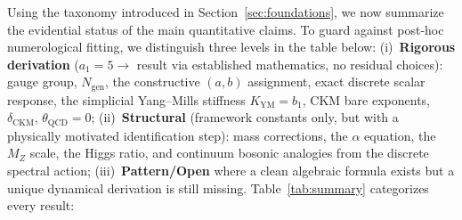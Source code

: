 \documentclass[12pt,a4paper]{article}
\theoremstyle{definition}
\begin{document}
Using the taxonomy introduced in Section~\ref{sec:foundations}, we now summarize the evidential status of the main quantitative claims.  To guard against post-hoc numerological fitting, we distinguish three levels in the table below: (i)~\textbf{Rigorous derivation} ($a_1 = 5 \to$ result via established mathematics, no residual choices): gauge group, $N_{\text{gen}}$, the constructive $(a,b)$ assignment, exact discrete scalar response, the simplicial Yang--Mills stiffness $K_{\mathrm{YM}} = b_1$, CKM bare exponents, $\delta_{\text{CKM}}$, $\theta_{\text{QCD}} = 0$; (ii)~\textbf{Structural} (framework constants only, but with a physically motivated identification step): mass corrections, the $\alpha$ equation, the $M_Z$ scale, the Higgs ratio, and continuum bosonic analogies from the discrete spectral action; (iii)~\textbf{Pattern/Open} where a clean algebraic formula exists but a unique dynamical derivation is still missing.  Table~\ref{tab:summary} categorizes every result:
\end{document}
